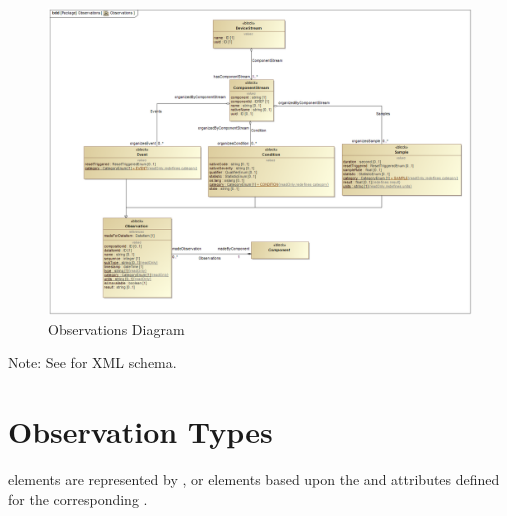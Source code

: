 \begin{figure}[ht]
  \centering
    \includegraphics[width=1.0\textwidth]{figures/Observations.png}
  \caption{Observations Diagram}
  \label{fig:Observations Diagram}
\end{figure}

\FloatBarrier


Note: See  for XML schema.







\section{Observation Types}
\label{sec:Observation Types}

 elements are represented by ,  or  elements based upon the  and  attributes defined for the corresponding .








